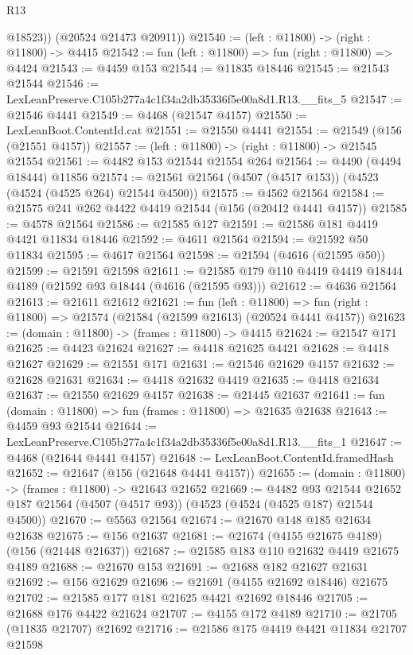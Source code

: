 \begin{lexlean}{R13}
\begin{coremodule}
          @18523))
      (@20524 @21473 @20911))
@21540 := (left : @11800) -> (right : @11800) -> @4415
@21542 := fun (left : @11800) => fun (right : @11800) => @4424
@21543 := @4459 @153
@21544 := @11835 @18446
@21545 := @21543 @21544
@21546 := LexLeanPreserve.C105b277a4c1f34a2db35336f5e00a8d1.R13.__fits_5
@21547 := @21546 @4441
@21549 := @4468 (@21547 @4157)
@21550 := LexLeanBoot.ContentId.cat
@21551 := @21550 @4441
@21554 := @21549 (@156 (@21551 @4157))
@21557 := (left : @11800) -> (right : @11800) -> @21545 @21554
@21561 := @4482 @153 @21544 @21554 @264
@21564 := @4490 (@4494 @18444) @11856
@21574 := @21561 @21564 (@4507 (@4517 @153)) (@4523 (@4524 (@4525 @264) @21544 @4500))
@21575 := @4562 @21564
@21584 := @21575 @241 @262 @4422 @4419 @21544 (@156 (@20412 @4441 @4157))
@21585 := @4578 @21564
@21586 := @21585 @127
@21591 := @21586 @181 @4419 @4421 @11834 @18446
@21592 := @4611 @21564
@21594 := @21592 @50 @11834
@21595 := @4617 @21564
@21598 := @21594 (@4616 (@21595 @50))
@21599 := @21591 @21598
@21611 := @21585 @179 @110 @4419 @4419 @18444 @4189 (@21592 @93 @18444 (@4616 (@21595 @93)))
@21612 := @4636 @21564
@21613 := @21611 @21612
@21621 := fun (left : @11800) =>
  fun (right : @11800) => @21574 (@21584 (@21599 @21613) (@20524 @4441 @4157))
@21623 := (domain : @11800) -> (frames : @11800) -> @4415
@21624 := @21547 @171
@21625 := @4423 @21624
@21627 := @4418 @21625 @4421
@21628 := @4418 @21627
@21629 := @21551 @171
@21631 := @21546 @21629 @4157
@21632 := @21628 @21631
@21634 := @4418 @21632 @4419
@21635 := @4418 @21634
@21637 := @21550 @21629 @4157
@21638 := @21445 @21637
@21641 := fun (domain : @11800) => fun (frames : @11800) => @21635 @21638
@21643 := @4459 @93 @21544
@21644 := LexLeanPreserve.C105b277a4c1f34a2db35336f5e00a8d1.R13.__fits_1
@21647 := @4468 (@21644 @4441 @4157)
@21648 := LexLeanBoot.ContentId.framedHash
@21652 := @21647 (@156 (@21648 @4441 @4157))
@21655 := (domain : @11800) -> (frames : @11800) -> @21643 @21652
@21669 := @4482
    @93
    @21544
    @21652
    @187
    @21564
    (@4507 (@4517 @93))
    (@4523 (@4524 (@4525 @187) @21544 @4500))
@21670 := @5563 @21564
@21674 := @21670 @148 @185 @21634 @21638
@21675 := @156 @21637
@21681 := @21674 (@4155 @21675 @4189) (@156 (@21448 @21637))
@21687 := @21585 @183 @110 @21632 @4419 @21675 @4189
@21688 := @21670 @153
@21691 := @21688 @182 @21627 @21631
@21692 := @156 @21629
@21696 := @21691 (@4155 @21692 @18446) @21675
@21702 := @21585 @177 @181 @21625 @4421 @21692 @18446
@21705 := @21688 @176 @4422 @21624
@21707 := @4155 @172 @4189
@21710 := @21705 (@11835 @21707) @21692
@21716 := @21586 @175 @4419 @4421 @11834 @21707 @21598

\end{coremodule}
\end{lexlean}
